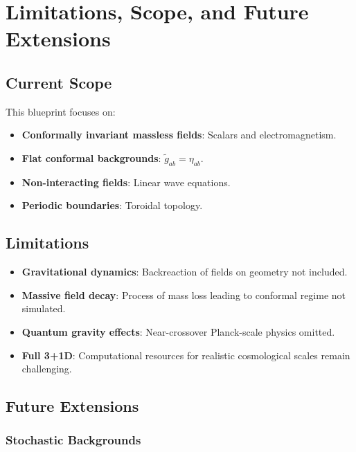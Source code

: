 \documentclass[11pt,a4paper]{article}
\theoremstyle{plain}
\theoremstyle{definition}
\theoremstyle{remark}
\begin{document}
\section{Limitations, Scope, and Future Extensions}\label{sec:limitations}

\subsection{Current Scope}

This blueprint focuses on:
\begin{itemize}
    \item \textbf{Conformally invariant massless fields}: Scalars and electromagnetism.
    \item \textbf{Flat conformal backgrounds}: $\tilde{g}_{ab} = \eta_{ab}$.
    \item \textbf{Non-interacting fields}: Linear wave equations.
    \item \textbf{Periodic boundaries}: Toroidal topology.
\end{itemize}

\subsection{Limitations}

\begin{itemize}
    \item \textbf{Gravitational dynamics}: Backreaction of fields on geometry not included.
    \item \textbf{Massive field decay}: Process of mass loss leading to conformal regime not simulated.
    \item \textbf{Quantum gravity effects}: Near-crossover Planck-scale physics omitted.
    \item \textbf{Full 3+1D}: Computational resources for realistic cosmological scales remain challenging.
\end{itemize}

\subsection{Future Extensions}

\subsubsection{Stochastic Backgrounds}
\end{document}
